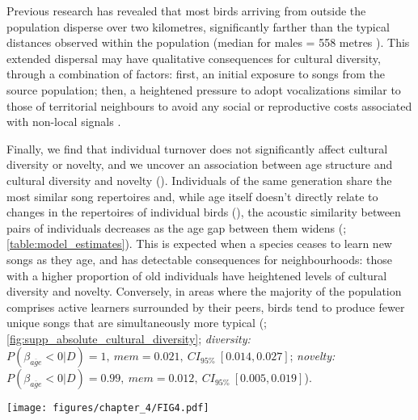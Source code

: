 Previous research \parencite{verhulst1997} has revealed that most birds arriving from outside the population disperse over two kilometres, significantly farther than the typical distances observed within the population (median for males = 558 metres \parencite{greenwood1979}). This extended dispersal may have qualitative consequences for cultural diversity, through a combination of factors: first, an initial exposure to songs from the source population; then, a heightened pressure to adopt vocalizations similar to those of territorial neighbours to avoid any social or reproductive costs associated with non-local signals \parencite{payne1983, baker1981, mortega2014, lachlan2014, beecher2008}.

Finally, we find that individual turnover does not significantly affect cultural diversity or novelty, and we uncover an association between age structure and cultural diversity and novelty (). Individuals of the same generation share the most similar song repertoires and, while age itself doesn't directly relate to changes in the repertoires of individual birds (), the acoustic similarity between pairs of individuals decreases as the age gap between them widens (; \autoref{table:model_estimates}). This is expected when a species ceases to learn new songs as they age, and  has detectable consequences for neighbourhoods: those with a higher proportion of old individuals have heightened levels of cultural diversity and novelty. Conversely, in areas where the majority of the population comprises active learners surrounded by their peers, birds tend to produce fewer unique songs that are simultaneously more typical (; \autoref{fig:supp_absolute_cultural_diversity}; \textit{diversity:} $P(\beta_{\overline{age}} < 0 | D) = 1,~mem=0.021,~CI_{95\%}~[0.014, 0.027]$; \textit{novelty:} $P(\beta_{\overline{age}} < 0 | D) = 0.99,~mem=0.012,~CI_{95\%}~[0.005, 0.019]$).

\begin{figure*}[th!]
    \centering
    \texttt{[image: figures/chapter\_4/FIG4.pdf]}
    \label{c4_fig:turnover}
\end{figure*}

